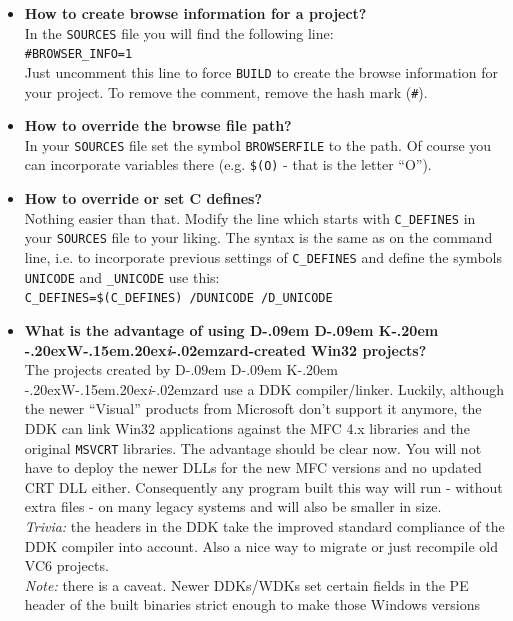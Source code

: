 \documentclass[a4paper,titlepage]{report}
\def\ddkwiz{D\kern-.09em D\kern-.09em K\kern-.20em \raise-.20ex\hbox{W}\kern-.15em\raise.20ex\hbox{\it{i}}\kern-.02em{zard}}
\begin{document}
\begin{itemize}
  \item \textbf{How to create browse information for a project?}\\
        In the \texttt{SOURCES} file you will find the following line:\\
        \verb+#BROWSER_INFO=1+\\
        Just uncomment this line to force \texttt{BUILD} to create
        the browse information for your project. To remove the comment,
        remove the hash mark (\verb+#+).
  \item \textbf{How to override the browse file path?}\\
        In your \texttt{SOURCES} file set the symbol \texttt{BROWSERFILE} to
        the path. Of course you can incorporate variables there (e.g. \verb+$(O)+ - that is the letter ``O'').
  \item \textbf{How to override or set C defines?}\\
        Nothing easier than that. Modify the line which starts with \verb+C_DEFINES+
        in your \texttt{SOURCES} file to your liking. The syntax is the same as on the
        command line, i.e. to incorporate previous settings of \verb+C_DEFINES+
        and define the symbols \verb+UNICODE+ and \verb+_UNICODE+ use this:\\
        \verb+C_DEFINES=$(C_DEFINES) /DUNICODE /D_UNICODE+
  \item \textbf{What is the advantage of using \ddkwiz{}-created Win32 projects?}\\
        The projects created by \ddkwiz{} use a DDK compiler/linker. Luckily, although the
        newer ``Visual'' products from Microsoft don't support it anymore,
        the DDK can link Win32 applications against the MFC 4.x libraries
        and the original \texttt{MSVCRT} libraries. The advantage should be
        clear now. You will not have to deploy the newer DLLs for the new
        MFC versions and no updated CRT DLL either. Consequently any program
        built this way will run - without extra files - on many legacy systems
        and will also be smaller in size.\\
        \emph{Trivia:} the headers in the DDK take the improved standard compliance
        of the DDK compiler into account. Also a nice way to migrate or just
        recompile old VC6 projects.\\
        \emph{Note:} there is a caveat. Newer DDKs/WDKs set certain fields in the
        PE header of the built binaries strict enough to make those Windows versions

\end{itemize}
\end{document}

